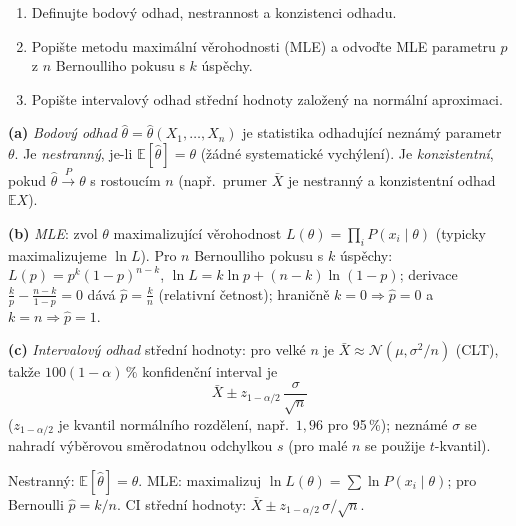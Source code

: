 \begin{zadani}
\begin{enumerate}[label=(\alph*)]
  \item {} Definujte bodový odhad, nestrannost a konzistenci odhadu.
  \item {} Popište metodu maximální věrohodnosti (MLE) a odvoďte MLE parametru $p$ z $n$ Bernoulliho pokusu s $k$ úspěchy.
  \item {} Popište intervalový odhad střední hodnoty založený na normální aproximaci.
\end{enumerate}
\end{zadani}

\begin{reseni}
\textbf{(a)} \emph{Bodový odhad} $\hat\theta=\hat\theta(X_1,\dots,X_n)$ je statistika odhadující neznámý parametr $\theta$. Je \emph{nestranný}, je-li $\mathbb{E}[\hat\theta]=\theta$ (žádné systematické vychýlení). Je \emph{konzistentní}, pokud $\hat\theta\xrightarrow{P}\theta$ s rostoucím $n$ (např.\ prumer $\bar X$ je nestranný a konzistentní odhad $\mathbb{E}X$).

\textbf{(b)} \emph{MLE}: zvol $\theta$ maximalizující věrohodnost $L(\theta)=\prod_i P(x_i\mid\theta)$ (typicky maximalizujeme $\ln L$). Pro $n$ Bernoulliho pokusu s $k$ úspěchy: $L(p)=p^k(1-p)^{n-k}$, $\ln L=k\ln p+(n-k)\ln(1-p)$; derivace $\frac{k}{p}-\frac{n-k}{1-p}=0$ dává $\hat p=\frac{k}{n}$ (relativní četnost); hraničně $k{=}0\Rightarrow\hat p{=}0$ a $k{=}n\Rightarrow\hat p{=}1$.

\textbf{(c)} \emph{Intervalový odhad} střední hodnoty: pro velké $n$ je $\bar X\approx\mathcal{N}(\mu,\sigma^2/n)$ (CLT), takže $100(1-\alpha)\,\%$ konfidenční interval je
\[
\bar X\pm z_{1-\alpha/2}\,\frac{\sigma}{\sqrt n}
\]
($z_{1-\alpha/2}$ je kvantil normálního rozdělení, např.\ $1{,}96$ pro 95\,\%); neznámé $\sigma$ se nahradí výběrovou směrodatnou odchylkou $s$ (pro malé $n$ se použije $t$-kvantil).
\end{reseni}

\begin{jadro}
Nestranný: $\mathbb{E}[\hat\theta]=\theta$. MLE: maximalizuj $\ln L(\theta)=\sum\ln P(x_i\mid\theta)$; pro Bernoulli $\hat p=k/n$. CI střední hodnoty: $\bar X\pm z_{1-\alpha/2}\,\sigma/\sqrt n$.
\end{jadro}

